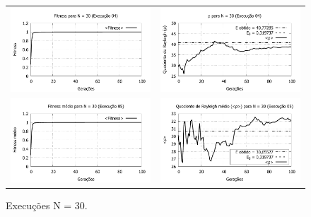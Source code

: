 \begin{figure}[phtb]
\begin{tabular}{@{}cc@{}}
		\includegraphics[width=.40\textwidth]{figs/resultados/fitnessGrad/N30_04_fitness.pdf} &
    \includegraphics[width=.40\textwidth]{figs/resultados/fitnessGrad/N30_04_rho.pdf}   \\
		\includegraphics[width=.40\textwidth]{figs/resultados/fitnessGrad/N30_05_fitness.pdf} &
    \includegraphics[width=.40\textwidth]{figs/resultados/fitnessGrad/N30_05_rho.pdf}
  \end{tabular}
  \caption{Execuções N = 30.}
	\label{fig:execucoes_N30}
\end{figure}

